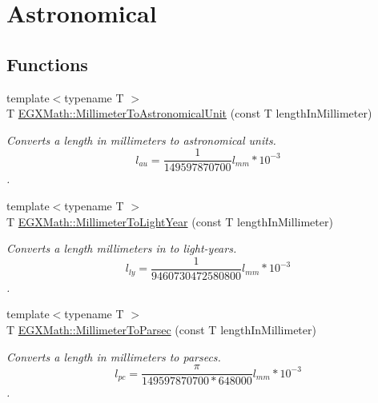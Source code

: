 \hypertarget{group___e_g_x_math-_conversions-_length_conversions-_millimeter-_astronomical}{}\section{Astronomical}
\label{group___e_g_x_math-_conversions-_length_conversions-_millimeter-_astronomical}
\subsection*{Functions}
\begin{DoxyCompactItemize}
\item 
{\footnotesize template$<$typename T $>$ }\\T \mbox{\hyperlink{group___e_g_x_math-_conversions-_length_conversions-_millimeter-_astronomical_ga1ebdde429def9d2f19771a8847f9cfb5}{E\+G\+X\+Math\+::\+Millimeter\+To\+Astronomical\+Unit}} (const T length\+In\+Millimeter)
\begin{DoxyCompactList}\small\item\em Converts a length in millimeters to astronomical units. \[ l_{au}= \frac{1}{149597870700} l_{mm} * 10^{-3} \]. \end{DoxyCompactList}\item 
{\footnotesize template$<$typename T $>$ }\\T \mbox{\hyperlink{group___e_g_x_math-_conversions-_length_conversions-_millimeter-_astronomical_gaca60b964c53d123506847dd98ba8a00b}{E\+G\+X\+Math\+::\+Millimeter\+To\+Light\+Year}} (const T length\+In\+Millimeter)
\begin{DoxyCompactList}\small\item\em Converts a length millimeters in to light-\/years. \[ l_{ly}= \frac{1}{9460730472580800} l_{mm} * 10^{-3} \]. \end{DoxyCompactList}\item 
{\footnotesize template$<$typename T $>$ }\\T \mbox{\hyperlink{group___e_g_x_math-_conversions-_length_conversions-_millimeter-_astronomical_ga55cf82aa51af1d469ae58cc5d03570f7}{E\+G\+X\+Math\+::\+Millimeter\+To\+Parsec}} (const T length\+In\+Millimeter)
\begin{DoxyCompactList}\small\item\em Converts a length in millimeters to parsecs. \[ l_{pc}=\frac{\pi}{149597870700 * 648000} l_{mm} * 10^{-3} \]. \end{DoxyCompactList}\end{DoxyCompactItemize}


